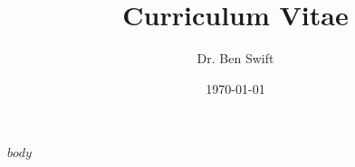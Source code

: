 \documentclass[a4paper,fontsize=12pt]{scrartcl}
\author{Dr. Ben Swift}
\date{\today}
\title{Curriculum Vitae}
\begin{document}
\maketitle

$body$
\end{document}
